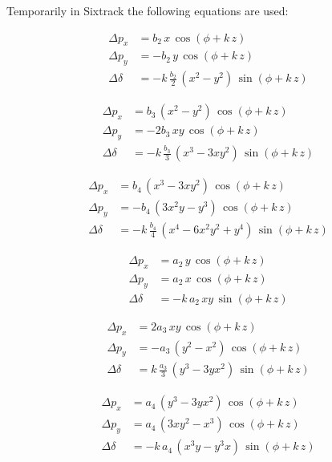 \documentclass[english]{article}
\begin{document}
Temporarily in Sixtrack the following equations are used:

\begin{align}\Delta p_{x} & =b_{2}\, x\,\cos\left(\phi+k\, z\right)\\
\Delta p_{y} & =-b_{2}\, y\,\cos\left(\phi+k\, z\right)\\
\Delta\delta & =-k\,\frac{b_{2}}{2}\,\left(x^{2}-y^{2}\right)\,\sin\left(\phi+k\, z\right)
\end{align}

 \begin{align}\Delta p_{x} & =b_{3}\,\left(x^{2}-y^{2}\right)\,\cos\left(\phi+k\, z\right)\\
\Delta p_{y} & =-2b_{3}\, xy\,\cos\left(\phi+k\, z\right)\\
\Delta\delta & =-k\,\frac{b_{3}}{3}\,\left(x^{3}-3xy^{2}\right)\,\sin\left(\phi+k\, z\right)
\end{align}

 \begin{align}\Delta p_{x} & =b_{4}\,\left(x^{3}-3xy^{2}\right)\,\cos\left(\phi+k\, z\right)\\
\Delta p_{y} & =-b_{4}\,\left(3x^{2}y-y^{3}\right)\,\cos\left(\phi+k\, z\right)\\
\Delta\delta & =-k\,\frac{b_{4}}{4}\,\left(x^{4}-6x^{2}y^{2}+y^{4}\right)\,\sin\left(\phi+k\, z\right)
\end{align}

 \begin{align}\Delta p_{x} & =a_{2}\, y\,\cos\left(\phi+k\, z\right)\\
\Delta p_{y} & =a_{2}\, x\,\cos\left(\phi+k\, z\right)\\
\Delta\delta & =-k\, a_{2}\, xy\,\sin\left(\phi+k\, z\right)
\end{align}

 \begin{align}\Delta p_{x} & =2a_{3}\, xy\,\cos\left(\phi+k\, z\right)\\
\Delta p_{y} & =-a_{3}\,\left(y^{2}-x^{2}\right)\,\cos\left(\phi+k\, z\right)\\
\Delta\delta & =k\,\frac{a_{3}}{3}\,\left(y^{3}-3yx^{2}\right)\,\sin\left(\phi+k\, z\right)
\end{align}

 \begin{align}\Delta p_{x} & =a_{4}\,\left(y^{3}-3yx^{2}\right)\,\cos\left(\phi+k\, z\right)\\
\Delta p_{y} & =a_{4}\,\left(3xy^{2}-x^{3}\right)\,\cos\left(\phi+k\, z\right)\\
\Delta\delta & =-k\, a_{4}\,\left(x^{3}y-y^{3}x\right)\,\sin\left(\phi+k\, z\right)
\end{align}
 
\end{document}
